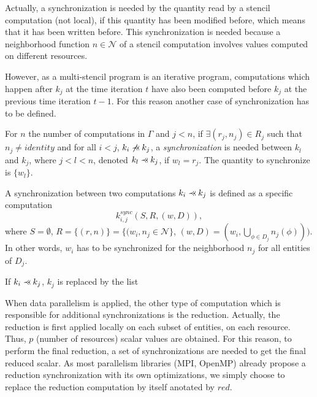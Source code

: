 Actually, a synchronization is needed by the quantity read by a stencil computation (not local), if this quantity has been modified before, which means that it has been written before. This synchronization is needed because a neighborhood function $n \in \mathcal{N}$ of a stencil computation involves values computed on different resources.

However, as a multi-stencil program is an iterative program, computations which happen after $k_j$ at the time iteration $t$ have also been computed before $k_j$ at the previous time iteration $t-1$. For this reason another case of synchronization has to be defined.

\begin{mydef}
For $n$ the number of computations in $\Gamma$ and $j<n$, if $\exists (r_j,n_j) \in R_j$ such that $n_j\neq identity$ and for all $i<j$, $k_i \not \pprec k_j$, a \textit{synchronization} is needed between $k_l$ and $k_j$, where $j<l<n$, denoted $k_l \pprec k_j$, if $w_l=r_j$. The quantity to synchronize is $\{w_l\}$.
\label{def:sync2}
\end{mydef}

\begin{mydef}
A synchronization between two computations $k_i \pprec k_j$ is defined as a specific computation 
\begin{equation*}
k_{i,j}^{sync}(S,R,(w,D)), 
\end{equation*}
where $S=\emptyset$, $R=\{(r,n)\}=\{(w_i,n_j \in \mathcal{N}\}$, $(w,D)=(w_i,\bigcup_{\phi \in D_j} n_j(\phi)))$. In other words, $w_i$ has to be synchronized for the neighborhood $n_j$ for all entities of $D_j$.
\end{mydef}

\begin{mydef}
If $k_i \pprec k_j$, $k_j$ is replaced by the list
\begin{equation*}
[k_{i,j}^{sync}, k_j]
\end{equation*}
\end{mydef}

When data parallelism is applied, the other type of computation which is responsible for additional synchronizations is the reduction. Actually, the reduction is first applied locally on each subset of entities, on each resource. Thus, $p$ (number of resources) scalar values are obtained. For this reason, to perform the final reduction, a set of synchronizations are needed to get the final reduced scalar. As most parallelism libraries (MPI, OpenMP) already propose a reduction synchronization with its own optimizations, we simply choose to replace the reduction computation by itself anotated by $red$.


